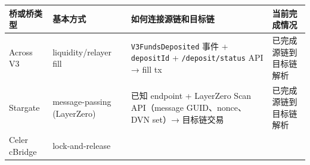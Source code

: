 \documentclass[12pt,a4paper]{ctexart}
\begin{document}
\begin{longtable}[]{@{}llll@{}}
\toprule
\begin{minipage}[b]{0.22\columnwidth}\raggedright
桥或桥类型\strut
\end{minipage} & \begin{minipage}[b]{0.22\columnwidth}\raggedright
基本方式\strut
\end{minipage} & \begin{minipage}[b]{0.22\columnwidth}\raggedright
如何连接源链和目标链\strut
\end{minipage} & \begin{minipage}[b]{0.22\columnwidth}\raggedright
当前完成情况\strut
\end{minipage}\tabularnewline
\midrule
\endhead
\begin{minipage}[t]{0.22\columnwidth}\raggedright
Across V3\strut
\end{minipage} & \begin{minipage}[t]{0.22\columnwidth}\raggedright
liquidity/relayer fill\strut
\end{minipage} & \begin{minipage}[t]{0.22\columnwidth}\raggedright
\texttt{V3FundsDeposited} 事件 + \texttt{depositId} +
\texttt{/deposit/status} API → fill tx\strut
\end{minipage} & \begin{minipage}[t]{0.22\columnwidth}\raggedright
已完成源链到目标链解析\strut
\end{minipage}\tabularnewline
\begin{minipage}[t]{0.22\columnwidth}\raggedright
Stargate\strut
\end{minipage} & \begin{minipage}[t]{0.22\columnwidth}\raggedright
message-passing (LayerZero)\strut
\end{minipage} & \begin{minipage}[t]{0.22\columnwidth}\raggedright
已知 endpoint + LayerZero Scan API（message GUID、nonce、DVN set）→ 目标链交易\strut
\end{minipage} & \begin{minipage}[t]{0.22\columnwidth}\raggedright
已完成源链到目标链解析\strut
\end{minipage}\tabularnewline
\begin{minipage}[t]{0.22\columnwidth}\raggedright
Celer cBridge\strut
\end{minipage} & \begin{minipage}[t]{0.22\columnwidth}\raggedright
lock-and-release\strut
\end{minipage} & \begin{minipage}[t]{0.22\columnwidth}\raggedright

\end{minipage}
\end{longtable}
\end{document}
